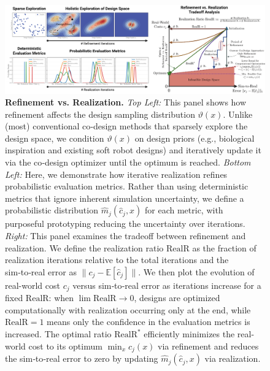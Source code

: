 \begin{figure}[ht]
    \centering
    \includegraphics[width=1.0\linewidth]{appendix-holistic-codesign/figures/refinement_vs_realization_tradeoff_optimized.pdf}
    \caption{\textbf{Refinement vs. Realization.}
    \textit{Top Left:} This panel shows how refinement affects the design sampling distribution $\vartheta(x)$. Unlike (most) conventional co‑design methods that sparsely explore the design space, we condition $\vartheta(x)$ on design priors (e.g., biological inspiration and existing soft robot designs) and iteratively update it via the co‑design optimizer until the optimum is reached.
    \textit{Bottom Left:} Here, we demonstrate how iterative realization refines probabilistic evaluation metrics. Rather than using deterministic metrics that ignore inherent simulation uncertainty, we define a probabilistic distribution $\hat{m}_j(\hat{c}_j, x)$ for each metric, with purposeful prototyping reducing the uncertainty over iterations.
    \textit{Right:} This panel examines the tradeoff between refinement and realization. We define the realization ratio $\mathrm{RealR}$ as the fraction of realization iterations relative to the total iterations and the sim‑to‑real error as $\lVert c_j - \mathbb{E}[\hat{c}_j] \rVert$. We then plot the evolution of real-world cost $c_j$ versus sim‑to‑real error as iterations increase for a fixed $\mathrm{RealR}$: when $\lim{\mathrm{RealR} \to 0}$, designs are optimized computationally with realization occurring only at the end, while $\mathrm{RealR}=1$ means only the confidence in the evaluation metrics is increased. The optimal ratio $\mathrm{RealR}^*$ efficiently minimizes the real-world cost to its optimum $\min_x c_j(x)$ via refinement and reduces the sim‑to‑real error to zero by updating $\hat{m}_j(\hat{c}_j, x)$ via realization.
    }\label{fig:apx:holisticcodesign:refinement_vs_realization_tradeoff}
\end{figure}

